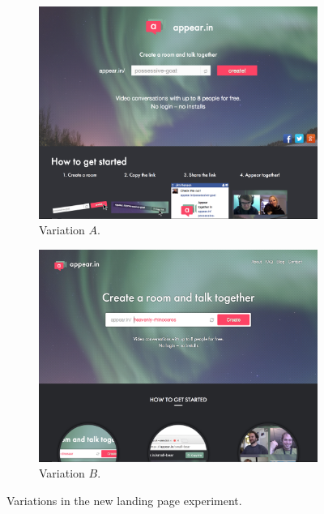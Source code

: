 \begin{figure}[h]
  \centering
    \begin{subfigure}[t]{0.8\textwidth}
      \centering
      \includegraphics[width=\textwidth]{Figures/screenshots/ab-frontpage/variation-off}
      \caption{Variation $A$.}
      \label{fig:variation_a}
    \end{subfigure}

    \vspace{1em}

    \begin{subfigure}[t]{0.8\textwidth}
      \centering
      \includegraphics[width=\textwidth]{Figures/screenshots/ab-frontpage/variation-on}
      \caption{Variation $B$.}
      \label{fig:variation_b}
    \end{subfigure}

  \caption{Variations in the new landing page experiment.}
  \label{fig:variations}
\end{figure}

